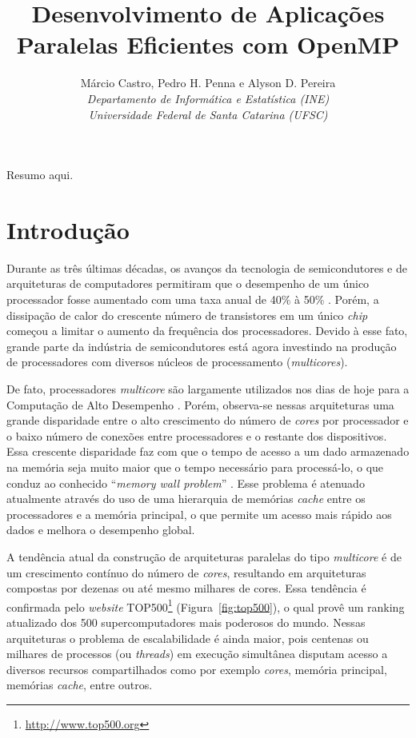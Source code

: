 \documentclass{SBCbookchapter}
\author{Márcio Castro, Pedro H. Penna e Alyson D. Pereira\\
\textit{Departamento de Informática e Estatística (INE)}\\
\textit{Universidade Federal de Santa Catarina (UFSC)}
}
\title{Desenvolvimento de Aplicações Paralelas Eficientes com OpenMP}
\begin{document}
\maketitle

\begin{resumo}
Resumo aqui.
\end{resumo}

\section{Introdução}

	Durante as três últimas décadas, os avanços da tecnologia de
	semicondutores e de arquiteturas de computadores permitiram que o
	desempenho de um único processador fosse aumentado com uma taxa anual de
	40\% à 50\% \cite{LARUS08}. Porém, a dissipação de calor do crescente
	número de transistores em um único \emph{chip} começou a limitar o
	aumento da frequência dos processadores. Devido à esse fato, grande
	parte da indústria de semicondutores está agora investindo na produção
	de processadores com diversos núcleos de processamento
	(\emph{multicores}).

	De fato, processadores \emph{multicore} são largamente utilizados nos
	dias de hoje para a Computação de Alto Desempenho \cite{Asanovic09}.
	Porém, observa-se nessas arquiteturas uma grande disparidade entre o
	alto crescimento do número de \emph{cores} por processador e o baixo
	número de conexões entre processadores e o restante dos dispositivos.
	Essa crescente disparidade faz com que o tempo de acesso a um dado
	armazenado na memória seja muito maior que o tempo necessário para
	processá-lo, o que conduz ao conhecido ``\emph{memory wall problem}''
	\cite{McKee-MemWall:2004}. Esse problema é atenuado atualmente através
	do uso de uma hierarquia de memórias \emph{cache} entre os processadores
	e a memória principal, o que permite um acesso mais rápido aos dados e
	melhora o desempenho global.

	A tendência atual da construção de arquiteturas paralelas do tipo
	\emph{multicore} é de um crescimento contínuo do número de \emph{cores},
	resultando em arquiteturas compostas por dezenas ou até mesmo milhares
	de cores. Essa tendência é confirmada pelo \emph{website}
	TOP500\footnote{\url{http://www.top500.org}} (Figura~\ref{fig:top500}),
	o qual provê um ranking atualizado dos 500 supercomputadores mais
	poderosos do mundo. Nessas arquiteturas o problema de escalabilidade é
	ainda maior, pois centenas ou milhares de processos (ou \emph{threads})
	em execução simultânea disputam acesso a diversos recursos
	compartilhados como por exemplo \emph{cores}, memória principal,
	memórias \emph{cache}, entre outros.
\end{document}

